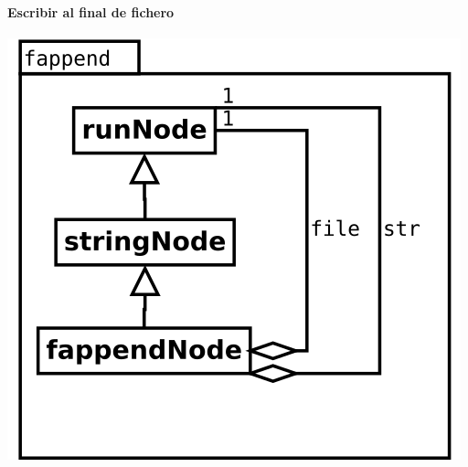 \paragraph {Escribir al final de fichero} 
\begin{center}
\includegraphics[scale=0.4]{fappend.png} \\
\end{center}
 
